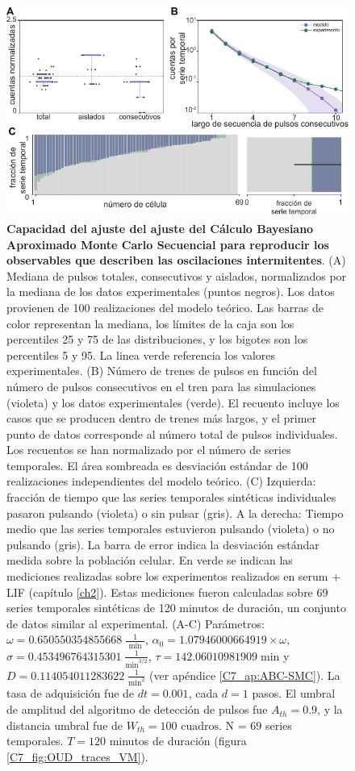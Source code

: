 \documentclass[./main.tex]{subfiles}
\begin{document}
\begin{figure}
    \centering
    \includegraphics[width=1\columnwidth]{figures/chapter7/C7_OUD_validation.pdf} 
    \caption{\textbf{Capacidad del ajuste del ajuste del Cálculo Bayesiano Aproximado Monte Carlo Secuencial para reproducir los observables que describen las oscilaciones intermitentes}. (A)  Mediana de pulsos totales, consecutivos y aislados, normalizados por la mediana de los datos experimentales (puntos negros). Los datos provienen de 100 realizaciones del modelo teórico. Las barras de color representan la mediana, los límites de la caja son los percentiles 25 y 75 de las distribuciones, y los bigotes son los percentiles 5 y 95. La linea verde referencia los valores experimentales. (B) Número de trenes de pulsos en función del número de pulsos consecutivos en el tren para las simulaciones (violeta) y los datos experimentales (verde). El recuento incluye los casos que se producen dentro de trenes más largos, y el primer punto de datos corresponde al número total de pulsos individuales. Los recuentos se han normalizado por el número de series temporales. El área sombreada es desviación estándar de 100 realizaciones independientes del modelo teórico. (C) Izquierda: fracción de tiempo que las series temporales sintéticas individuales pasaron pulsando (violeta) o sin pulsar (gris). A la derecha: Tiempo medio que las series temporales estuvieron pulsando (violeta) o no pulsando (gris). La barra de error indica la desviación estándar medida sobre la población celular. En verde se indican las mediciones realizadas sobre los experimentos realizados en serum + LIF (capítulo \ref{ch2}). Estas mediciones fueron calculadas sobre 69 series temporales sintéticas de 120 minutos de duración, un conjunto de datos similar al experimental. (A-C) Parámetros:  $\omega = 0.650550354855668 \; \frac{1}{\text{ min }}$, $\alpha_0 = 1.07946000664919 \times \omega$, $ \sigma = 0.453496764315301 \; \frac{1}{\text{min}^{3/2}}$, $\tau = 142.06010981909 \; \text{min} $ y $D = 0.114054011283622 \; \frac{1}{\text{min}^{2}}$ (ver apéndice \ref{C7_ap:ABC-SMC}). La tasa de adquisición fue de $dt = 0.001$, cada $d = 1$ pasos. El umbral de amplitud del algoritmo de detección de pulsos fue $A_{th} = 0.9$, y la distancia umbral fue de $W_{th} = 100\text{ cuadros}$. N = $69$ series temporales. $T = 120$ minutos de duración (figura \ref{C7_fig:OUD_traces_VM}).}
    \label{C7_fig:OUD_param_evaluation}
\end{figure} 
\end{document}
